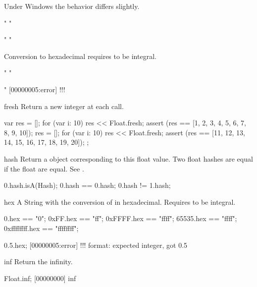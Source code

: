\begin{urbiscriptapi}
  \begin{windows}
    Under Windows the behavior differs slightly.
  \end{windows}
\begin{urbiassert}
"%
"%

"%
"%
\end{urbiassert}

  Conversion to hexadecimal requires \this to be integral.
\begin{urbiassert}
"%
"%

"%
[00000005:error] !!! %
\end{urbiassert}

\item[fresh]%
  Return a new integer at each call.
\begin{urbiscript}
{
  var res = [];
  for (var i: 10)
    res << Float.fresh;
  assert (res == [1, 2, 3, 4, 5, 6, 7, 8, 9, 10]);
  res = [];
  for (var i: 10)
    res << Float.fresh;
  assert (res == [11, 12, 13, 14, 15, 16, 17, 18, 19, 20]);
};
\end{urbiscript}

\item[hash] Return a  object corresponding to this float
  value. Two float hashes are equal if the float are equal. See
  .

\begin{urbiassert}
0.hash.isA(Hash);
0.hash == 0.hash;
0.hash != 1.hash;
\end{urbiassert}

\item[hex]
  A String with the conversion of \this in hexadecimal.  Requires \this to
  be integral.
\begin{urbiassert}
         0.hex == "0";
      0xFF.hex == "ff";
    0xFFFF.hex == "ffff";
     65535.hex == "ffff";
0xffffffff.hex == "ffffffff";

   0.5.hex;
[00000005:error] !!! format: expected integer, got 0.5
\end{urbiassert}

\item[inf]
  Return the infinity.
\begin{urbiscript}
Float.inf;
[00000000] inf
\end{urbiscript}


\end{urbiscriptapi}
